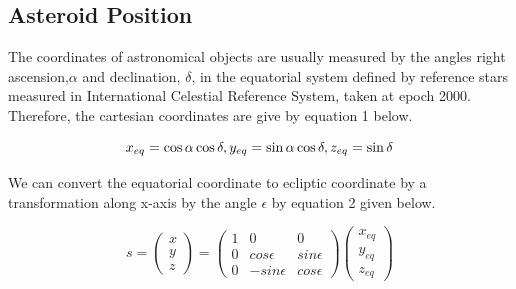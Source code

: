 \documentclass[letterpaper,12pt]{article}
\begin{document}
\subsection{Asteroid Position}
The coordinates of astronomical objects are usually measured by the angles right ascension,\begin{math}\alpha \end{math} and declination, \begin{math} \delta \end{math}, in the equatorial system defined by reference stars measured in International Celestial Reference System, taken at epoch 2000. Therefore, the cartesian coordinates are give by equation 1 below.

\begin{equation}
x_{eq}=\cos\alpha \cos\delta, \\ 
y_{eq}=\sin\alpha \cos\delta , \\ 
z_{eq}=\sin\delta
\end{equation}

We can convert the equatorial coordinate to ecliptic coordinate by a transformation along x-axis by the angle \begin{math} \epsilon \end{math} by equation 2 given below.

\begin{equation}
s=
\begin{pmatrix}
  x \\
  y \\
  z
 \end{pmatrix} 
  =
\begin{pmatrix}
1 & 0 & 0 \\ 
 0 & cos\epsilon & sin\epsilon\\ 
 0 & -sin\epsilon & cos\epsilon
\end{pmatrix}
\begin{pmatrix}
  x_{eq} \\
  y_{eq} \\
  z_{eq}
\end{pmatrix} 
\end{equation}
\end{document}
